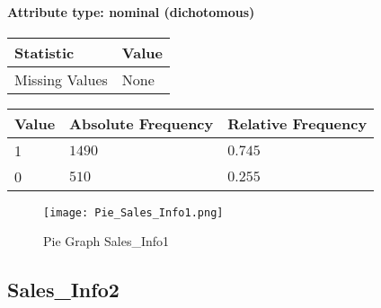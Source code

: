 \paragraph{Attribute type: nominal (dichotomous)}
\qquad
\begin{table}[H]
	\renewcommand{\arraystretch}{1.25}
	\begin{tabular}{l|l}
		\textbf{Statistic} & \textbf{Value}\\\hline
		Missing Values& None\\\hline
	\end{tabular}
\end{table}
\begin{table}[H]
	\renewcommand{\arraystretch}{1.25}
	\begin{tabular}{l|l|l}
		\textbf{Value} & \textbf{Absolute Frequency} & \textbf{Relative Frequency}\\\hline
		1&$1490$&$0.745$\\\hline
		0&$510$&$0.255$
	\end{tabular}
\end{table}
\begin{figure}[H]
	\begin{center}
		\texttt{[image: Pie\_Sales\_Info1.png]}
	\end{center}
	\caption{Pie Graph Sales\_Info1}
\end{figure}

\subsection{Sales\_Info2}
